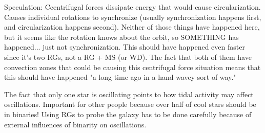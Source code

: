 Speculation:
Ccentrifugal forces dissipate energy that would cause circularization. Causes individual rotations to synchronize (usually synchronization happens first, and circularization happens second). Neither of those things have happened here, but it seems like the rotation knows about the orbit, so SOMETHING has happened... just not synchronization. This should have happened even faster since it's two RGs, not a RG + MS (or WD). The fact that both of them have convection zones that could be causing this centrifugal force situation means that this should have happened "a long time ago in a hand-wavey sort of way."

The fact that only one star is oscillating points to how tidal activity may affect oscillations.
Important for other people because over half of cool stars should be in binaries! Using RGs to probe the galaxy has to be done carefully because of external influences of binarity on oscillations.
